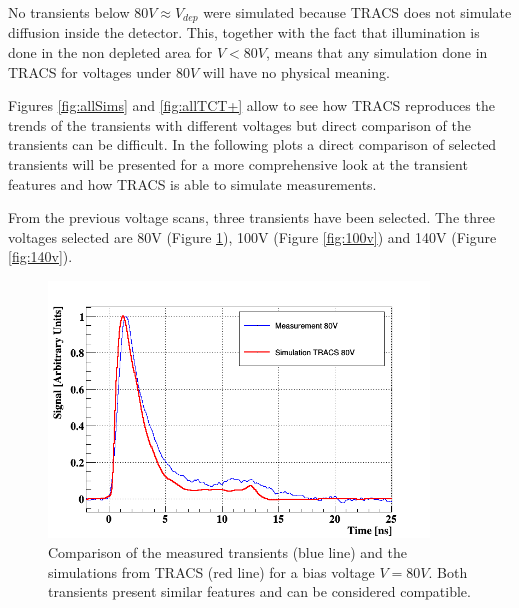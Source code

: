 No transients below $80V \approx V_{dep}$ were simulated because TRACS does not simulate diffusion inside the detector. This, together with the fact that illumination is done in the non depleted area for $V < 80V$, means that any simulation done in TRACS for voltages under $80V$ will have no physical meaning.

Figures \ref{fig:allSims} and \ref{fig:allTCT+} allow to see how TRACS reproduces the trends of the transients with different voltages but direct comparison of the transients can be difficult. In the following plots a direct comparison of selected transients will be presented for a more comprehensive look at the transient features and how TRACS is able to simulate measurements.

From the previous voltage scans, three transients have been selected. The three voltages selected are 80V (Figure \ref{fig:80v}), 100V (Figure \ref{fig:100v}) and 140V (Figure \ref{fig:140v}). 

\begin{figure}[H]
	\centering
	\includegraphics[width=0.9\textwidth]{80V.png}
	\caption{Comparison of the measured transients (blue line) and the simulations from TRACS (red line) for a bias voltage $V = 80V$. Both transients present similar features and can be considered compatible.}
	\label{fig:80v} 
\end{figure}


